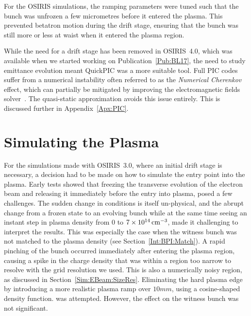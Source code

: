 For the OSIRIS simulations, the ramping parameters were tuned such that the bunch was unfrozen a few micrometres before it entered the plasma.
This prevented betatron motion during the drift stage, ensuring that the bunch was still more or less at waist when it entered the plasma region.

While the need for a drift stage has been removed in OSIRIS~4.0, which was available when we started working on Publication~\ref{Pub:BL17}, the need to study emittance evolution meant QuickPIC was a more suitable tool.
Full PIC codes suffer from a numerical instability often referred to as the \textit{Numerical Cherenkov} effect, which can partially be mitigated by improving the electromagnetic fields solver~\cite{lehe:2013}.
The quasi-static approximation avoids this issue entirely.
This is discussed further in Appendix~\ref{Apx:PIC}.

\section{Simulating the Plasma}
\label{Sim:Plasma}

For the simulations made with OSIRIS~3.0, where an initial drift stage is necessary, a decision had to be made on how to simulate the entry point into the plasma.
Early tests showed that freezing the transverse evolution of the electron beam and releasing it immediately before the entry into plasma, posed a few challenges.
The sudden change in conditions is itself un-physical, and the abrupt change from a frozen state to an evolving bunch while at the same time seeing an instant step in plasma density from $0$ to $7\times 10^{14}\,\mathrm{cm}^{-3}$, made it challenging to interpret the results.
This was especially the case when the witness bunch was not matched to the plasma density (see Section~\ref{Int:BPI:Match}).
A rapid pinching of the bunch occurred immediately after entering the plasma region, causing a spike in the charge density that was within a region too narrow to resolve with the grid resolution we used.
This is also a numerically noisy region, as discussed in Section~\ref{Sim:EBeam:SizeRes}.
Eliminating the hard plasma edge by introducing a more realistic plasma ramp over $10\unit{mm}$, using a cosine-shaped density function. was attempted.
However, the effect on the witness bunch was not significant.
